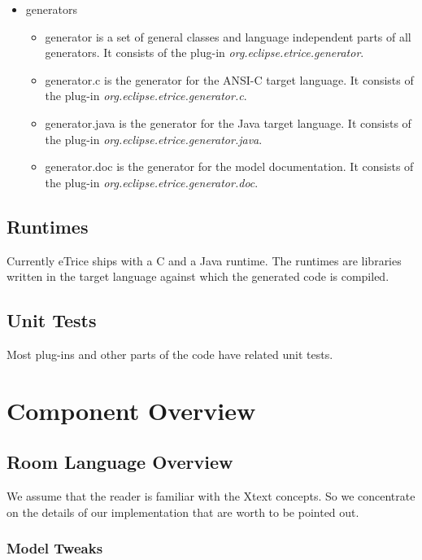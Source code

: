 \begin{itemize}
\item generators
\begin{itemize}
\item generator is a set of general classes and language independent parts of all generators. It consists of the plug-in \textit{org.eclipse.etrice.generator}.
\item generator.c is the generator for the ANSI-C target language. It consists of the plug-in \textit{org.eclipse.etrice.generator.c}.
\item generator.java is the generator for the Java target language. It consists of the plug-in \textit{org.eclipse.etrice.generator.java}.
\item generator.doc is the generator for the model documentation. It consists of the plug-in \textit{org.eclipse.etrice.generator.doc}.
\end{itemize}
\end{itemize}

\subsection{Runtimes}

Currently eTrice ships with a C and a Java runtime. The runtimes are libraries written in the target language against which the generated code is compiled.

\subsection{Unit Tests}

Most plug-ins and other parts of the code have related unit tests.

\section{Component Overview}

\subsection{Room Language Overview}

We assume that the reader is familiar with the Xtext concepts. So we concentrate on the details of our implementation that are worth to be pointed out.

\subsubsection{Model Tweaks}

